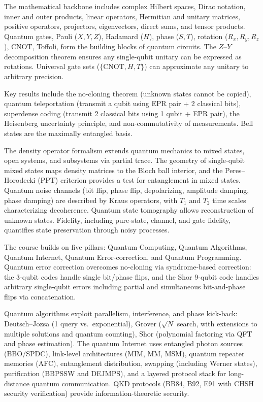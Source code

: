 \documentclass[10pt,a4paper]{article}
\begin{document}
The mathematical backbone includes complex Hilbert spaces, Dirac notation, inner and outer products, linear operators, Hermitian and unitary matrices, positive operators, projectors, eigenvectors, direct sums, and tensor products. Quantum gates, Pauli ($X,Y,Z$), Hadamard ($H$), phase ($S,T$), rotation ($R_x,R_y,R_z$), CNOT, Toffoli, form the building blocks of quantum circuits. The $Z$--$Y$ decomposition theorem ensures any single-qubit unitary can be expressed as rotations. Universal gate sets ($\{\mathrm{CNOT},H,T\}$) can approximate any unitary to arbitrary precision.

Key results include the no-cloning theorem (unknown states cannot be copied), quantum teleportation (transmit a qubit using EPR pair + 2 classical bits), superdense coding (transmit 2 classical bits using 1 qubit + EPR pair), the Heisenberg uncertainty principle, and non-commutativity of measurements. Bell states are the maximally entangled basis.

The density operator formalism extends quantum mechanics to mixed states, open systems, and subsystems via partial trace. The geometry of single-qubit mixed states maps density matrices to the Bloch ball interior, and the Peres--Horodecki (PPT) criterion provides a test for entanglement in mixed states. Quantum noise channels (bit flip, phase flip, depolarizing, amplitude damping, phase damping) are described by Kraus operators, with $T_1$ and $T_2$ time scales characterizing decoherence. Quantum state tomography allows reconstruction of unknown states. Fidelity, including pure-state, channel, and gate fidelity, quantifies state preservation through noisy processes.

The course builds on five pillars: Quantum Computing, Quantum Algorithms, Quantum Internet, Quantum Error-correction, and Quantum Programming. Quantum error correction overcomes no-cloning via syndrome-based correction: the 3-qubit codes handle single bit/phase flips, and the Shor 9-qubit code handles arbitrary single-qubit errors including partial and simultaneous bit-and-phase flips via concatenation.

Quantum algorithms exploit parallelism, interference, and phase kick-back: Deutsch--Jozsa (1 query vs.\ exponential), Grover ($\sqrt{N}$ search, with extensions to multiple solutions and quantum counting), Shor (polynomial factoring via QFT and phase estimation). The quantum Internet uses entangled photon sources (BBO/SPDC), link-level architectures (MIM, MM, MSM), quantum repeater memories (AFC), entanglement distribution, swapping (including Werner states), purification (BBPSSW and DEJMPS), and a layered protocol stack for long-distance quantum communication. QKD protocols (BB84, B92, E91 with CHSH security verification) provide information-theoretic security.
\end{document}
